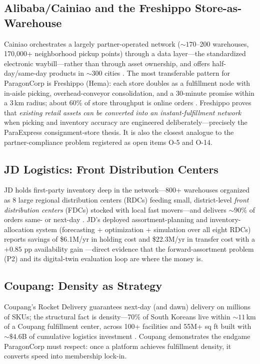 \subsection{Alibaba/Cainiao and the Freshippo Store-as-Warehouse}
Cainiao orchestrates a largely partner-operated network (${\sim}170$--200 warehouses, 170,000+ neighborhood pickup points) through a data layer---the standardized electronic waybill---rather than through asset ownership, and offers half-day/same-day products in ${\sim}300$ cities \cite{wirechina2024,scmp2023}. The most transferable pattern for ParagonCorp is Freshippo (Hema): each store doubles as a fulfillment node with in-aisle picking, overhead-conveyor consolidation, and a 30-minute promise within a 3\,km radius; about 60\% of store throughput is online orders \cite{vangaalen2022}. Freshippo proves that \emph{existing retail assets can be converted into an instant-fulfillment network} when picking and inventory accuracy are engineered deliberately---precisely the ParaExpress consignment-store thesis. It is also the closest analogue to the partner-compliance problem registered as open items O-5 and O-14.

\subsection{JD Logistics: Front Distribution Centers}
JD holds first-party inventory deep in the network---800+ warehouses organized as 8 large regional distribution centers (RDCs) feeding small, district-level \emph{front distribution centers} (FDCs) stocked with local fast movers---and delivers ${\sim}90\%$ of orders same- or next-day \cite{statista2024}. JD's deployed assortment-planning and inventory-allocation system (forecasting + optimization + simulation over all eight RDCs) reports savings of \$6.1M/yr in holding cost and \$22.3M/yr in transfer cost with a $+0.85$ pp availability gain \cite{wang2025}---direct evidence that the forward-assortment problem (P2) and its digital-twin evaluation loop are where the money is.

\subsection{Coupang: Density as Strategy}
Coupang's Rocket Delivery guarantees next-day (and dawn) delivery on millions of SKUs; the structural fact is density---70\% of South Koreans live within ${\sim}11$\,km of a Coupang fulfillment center, across 100+ facilities and 55M+ sq ft built with ${\sim}\$4.6$B of cumulative logistics investment \cite{goodwater2021,coupang2025}. Coupang demonstrates the endgame ParagonCorp must respect: once a platform achieves fulfillment density, it converts speed into membership lock-in.

